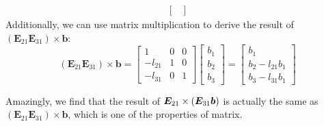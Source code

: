\begin{example}
\begin{gather*}
\begin{bmatrix}
\end{bmatrix}
\end{gather*}
Additionally, we can use matrix multiplication to derive the result of $(\bm E_{21}\bm E_{31})\times\bm b$:
\[
(\bm E_{21}\bm E_{31})\times\bm b=\begin{bmatrix}
1&0&0\\-l_{21}&1&0\\-l_{31}&0&1
\end{bmatrix}\begin{bmatrix}
b_1\\b_2\\b_3
\end{bmatrix}=\begin{bmatrix}
b_1\\b_2-l_{21}b_1\\b_3-l_{31}b_1
\end{bmatrix}
\]

Amazingly, we find that the result of $\bm E_{21}\times(\bm E_{31}\bm b)$ is actually the same as $(\bm E_{21}\bm E_{31})\times\bm b$, which is one of the properties of matrix.
\end{example}

